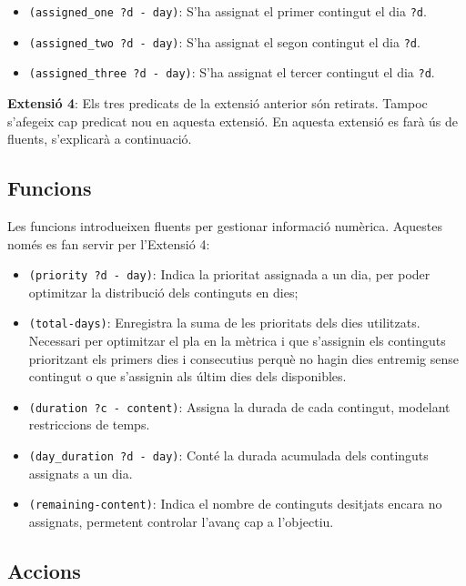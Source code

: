 \documentclass[a4paper]{article}
\begin{document}
	\begin{itemize}
		\item \texttt{(assigned\_one ?d - day)}: S'ha assignat el primer contingut el dia \texttt{?d}.
		\item \texttt{(assigned\_two ?d - day)}: S'ha assignat el segon contingut el dia \texttt{?d}.
		\item \texttt{(assigned\_three ?d - day)}: S'ha assignat el tercer contingut el dia \texttt{?d}.
	\end{itemize}
	
	\noindent \textbf{Extensió 4}: Els tres predicats de la extensió anterior són retirats. Tampoc s'afegeix cap predicat nou en aquesta extensió. En aquesta extensió es farà ús de fluents, s'explicarà a continuació.
	
	\subsection{Funcions}
	
	Les funcions introdueixen fluents per gestionar informació numèrica. Aquestes només es fan servir per l'Extensió 4:
	
	\begin{itemize}
		\item \texttt{(priority ?d - day)}: Indica la prioritat assignada a un dia, per poder optimitzar la distribució dels continguts en dies;
		\item \texttt{(total-days)}: Enregistra la suma de les prioritats dels dies utilitzats. Necessari per optimitzar el pla en la mètrica i que s'assignin els continguts prioritzant els primers dies i consecutius perquè no hagin dies entremig sense contingut o que s'assignin als últim dies dels disponibles.
		\item \texttt{(duration ?c - content)}: Assigna la durada de cada contingut, modelant restriccions de temps.
		\item \texttt{(day\_duration ?d - day)}: Conté la durada acumulada dels continguts assignats a un dia.
		\item \texttt{(remaining-content)}: Indica el nombre de continguts desitjats encara no assignats, permetent controlar l'avanç cap a l'objectiu.
	
	\end{itemize}
	
	\subsection{Accions}
	
\end{document}
